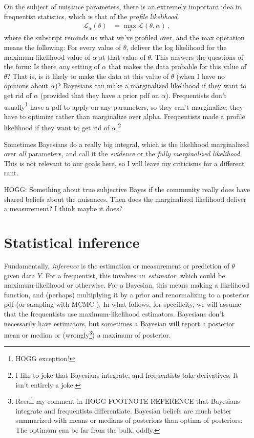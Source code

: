 \documentclass{article}
\begin{document}
On the subject of nuisance parameters,
there is an extremely important idea in frequentist statistics, which is that of the \emph{profile likelihood}.
\begin{align}
    \mathscr{L}_\alpha(\theta) &= \max_\alpha \mathscr{L}(\theta,\alpha) ~,
\end{align}
where the subscript reminds us what we've profiled over, and the max operation means the following:
For every value of $\theta$, deliver the log likelihood for the maximum-likelihood value of $\alpha$ at that value of $\theta$.
This answers the questions of the form:
Is there \emph{any} setting of $\alpha$ that makes the data probable for this value of $\theta$?
That is, is it likely to make the data at this value of $\theta$ (when I have no opinions about $\alpha$)?
Bayesians can make a marginalized likelihood if they want to get rid of $\alpha$ (provided that they have a prior pdf on $\alpha$).
Frequentists don't usually\footnote{%
HOGG exception!}
have a pdf to apply on any parameters, so they can't marginalize; they have to optimize rather than marginalize over alpha.
Frequentists made a profile likelihood if they want to get rid of $\alpha$.\footnote{%
I like to joke that Bayesians integrate, and frequentists take derivatives. It isn't entirely a joke.}

Sometimes Bayesians do a really big integral, which is the likelihood marginalized over \emph{all} parameters,
and call it the \emph{evidence} or the \emph{fully marginalized likelihood}.
This is not relevant to our goals here, so I will leave my criticisms for a different rant.

HOGG: Something about true subjective Bayes if the community really does have shared beliefs about the nuisances. Then does the marginalized likelihood deliver a measurement? I think maybe it does?

\section{Statistical inference}\label{sec:inference}
Fundamentally, \emph{inference} is the estimation or measurement or prediction of $\theta$ given data $Y$.
For a frequentist, this involves an \emph{estimator}, which could be maximum-likelihood or otherwise.
For a Bayesian, this means making a likelihood function, and (perhaps) multiplying it by a prior and renormalizing to a posterior pdf (or sampling with MCMC \cite{mcmc}).
In what follows, for specificity, we will assume that the frequentists use maximum-likelihood estimators.
Bayesians don't necessarily have estimators, but sometimes a Bayesian will report a posterior mean or median or (wrongly\footnote{%
Recall my comment in HOGG FOOTNOTE REFERENCE that Bayesians integrate and frequentists differentiate. Bayesian beliefs are much better summarized with means or medians of posteriors than optima of posteriors: The optimum can be far from the bulk, oddly.})
a maximum of posterior.
\end{document}
